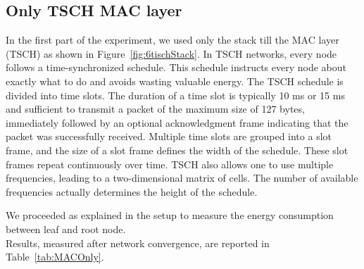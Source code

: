 \documentclass[conference]{IEEEtran}
\newcommand{\figref}[1]{Figure~\ref{#1}}
\newcommand{\tabref}[1]{Table~\ref{#1}}
\renewcommand\_{\textunderscore\allowbreak}
\begin{document}
\subsection{Only TSCH MAC layer}
In the first part of the experiment, we used only the stack till the MAC layer (TSCH) as shown in \figref{fig:6tischStack}.
In TSCH networks, every node follows a time-synchronized schedule. This schedule instructs every node about exactly what to do and avoids wasting valuable energy. The TSCH schedule is divided into time slots. The duration of a time slot is typically 10 ms or 15 ms and sufficient to transmit a packet of the maximum size of 127 bytes, immediately followed by an optional acknowledgment frame indicating that the packet was successfully received. Multiple time slots are grouped into a slot frame, and the size of a slot frame defines the width of the schedule. These slot frames repeat continuously over time. TSCH also allows one to use multiple frequencies, leading to a two-dimensional matrix of cells. The number of available frequencies actually determines the height of the schedule\cite{AccurateEnergyTSCH}.

We proceeded as explained in the setup to measure the energy consumption between leaf and root node.\\
Results, measured after network convergence, are reported in \tabref{tab:MACOnly}.
\end{document}
